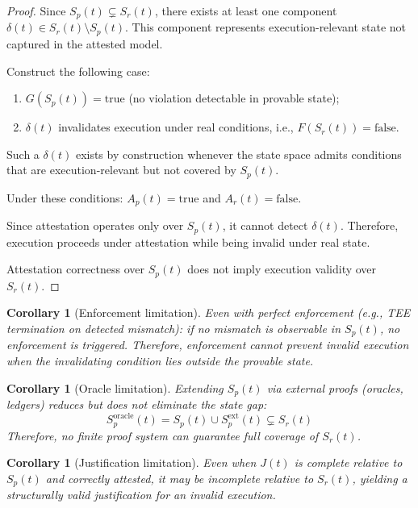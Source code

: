 \documentclass[11pt]{article}
\newtheorem{corollary}[theorem]{Corollary}
\newcommand{\Sr}{S_r}
\newcommand{\Sp}{S_p}
\newcommand{\Ar}{A_r}
\newcommand{\Ap}{A_p}
\begin{document}
\begin{proof}
Since $\Sp(t) \subsetneq \Sr(t)$, there exists at least one component
$\delta(t) \in \Sr(t) \setminus \Sp(t)$.
This component represents execution-relevant state not captured in the
attested model.

Construct the following case:
\begin{enumerate}[leftmargin=*, label=(\roman*)]
  \item $G(\Sp(t)) = \text{true}$ (no violation detectable in provable state);
  \item $\delta(t)$ invalidates execution under real conditions, i.e.,
        $F(\Sr(t)) = \text{false}$.
\end{enumerate}

Such a $\delta(t)$ exists by construction whenever the state space admits
conditions that are execution-relevant but not covered by $\Sp(t)$.

Under these conditions: $\Ap(t) = \text{true}$ and $\Ar(t) = \text{false}$.

Since attestation operates only over $\Sp(t)$, it cannot detect $\delta(t)$.
Therefore, execution proceeds under attestation while being invalid under
real state.

Attestation correctness over $\Sp(t)$ does not imply execution validity
over $\Sr(t)$.
\end{proof}

\begin{corollary}[Enforcement limitation]
\label{cor:enforcement}
Even with perfect enforcement (e.g., TEE termination on detected mismatch):
if no mismatch is observable in $\Sp(t)$, no enforcement is triggered.
Therefore, enforcement cannot prevent invalid execution when the invalidating
condition lies outside the provable state.
\end{corollary}

\begin{corollary}[Oracle limitation]
\label{cor:oracle}
Extending $\Sp(t)$ via external proofs (oracles, ledgers) reduces but does
not eliminate the state gap:
\[
\Sp^{\text{oracle}}(t) = \Sp(t) \cup \Sp^{\text{ext}}(t) \subsetneq \Sr(t)
\]
Therefore, no finite proof system can guarantee full coverage of $\Sr(t)$.
\end{corollary}

\begin{corollary}[Justification limitation]
\label{cor:justification}
Even when $J(t)$ is complete relative to $\Sp(t)$ and correctly attested,
it may be incomplete relative to $\Sr(t)$, yielding a structurally valid
justification for an invalid execution.
\end{corollary}
\end{document}
